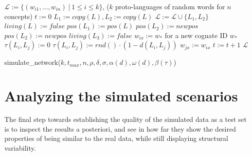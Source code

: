 \begin{algorithm}[H] \small
  \begin{algorithmic}[1]
  \STATE $\mathcal{L} := \{(w_{i1},\dots,w_{in})\ |\ 1 \leq i \leq k\}$, ($k$ proto-languages of random words for $n$ concepts)
  \STATE $t := 0$
        \STATE $L_1 := copy(L), L_2 := copy(L)$
        \STATE $\mathcal{L} := \mathcal{L} \cup \{L_1,L_2\}$
        \STATE $living(L) := false$
        \STATE $pos(L_1) := pos(L)$
          \STATE $pos(L_2) := newpos$
          \STATE $pos(L_2) := newpos$
          \STATE $living(L_3) := false$
        \ENDIF
      \ENDIF
    \ENDFOR
          \STATE $w_{ix} := w_{*}$ for a new cognate ID $w_{*}$
        \ENDIF
      \ENDFOR
    \ENDFOR
        \STATE $\tau(L_i,L_j) := 0$
        \STATE $\tau(L_i,L_j) := rnd() \cdot (1 - d(L_i,L_j))$
      \ENDIF
    \ENDFOR
          \STATE $w_{jx} := w_{ix}$
        \ENDIF
      \ENDFOR
    \ENDFOR
    \STATE $t := t + 1$
  \ENDWHILE
  \RETURN $\mathcal{L}$
  \end{algorithmic}
  \caption{simulate\_network($k,t_{max},n,\rho,\delta,\sigma,\alpha(d),\omega(d),\beta(\tau)$)}
  \label{alg:simulation}
\end{algorithm}


\section{Analyzing the simulated scenarios}
The final step towards establishing the quality of the simulated data as a test set is to inspect the results a posteriori, and see in how far they show the desired properties of being similar to the real data, while still displaying structural variability.

